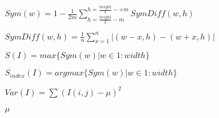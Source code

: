 \documentclass{article}
\begin{document}
$ Sym(w) = 1 - \frac{1}{2m} \sum_{h=\frac{height}{2}-m}^{h=\frac{height}{2}-+m} SymDiff(w,h) $
\pagebreak

$ SymDiff(w,h) = \frac{1}{n} \sum_{x=1}^n |(w-x,h) - (w+x,h)| $
\pagebreak

$ S(I) = max\{Sym(w) | w \in 1:width\} $
\pagebreak

$ S_{index}(I) = argmax\{ Sym(w) | w \in 1:width\} $
\pagebreak

$ Var(I) = \sum_{}^{} (I(i,j) - \mu )^2 $
\pagebreak

$ \mu $
\pagebreak
\end{document}
